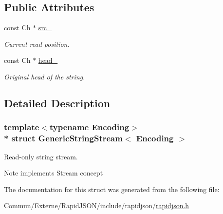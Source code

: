 \subsection*{Public Attributes}
\begin{DoxyCompactItemize}
\item 
const Ch $\ast$ \hyperlink{struct_generic_string_stream_aeda813798e3f2d6bfdac86afc11b6b80}{src\+\_\+}\hypertarget{struct_generic_string_stream_aeda813798e3f2d6bfdac86afc11b6b80}{}\label{struct_generic_string_stream_aeda813798e3f2d6bfdac86afc11b6b80}

\begin{DoxyCompactList}\small\item\em Current read position. \end{DoxyCompactList}\item 
const Ch $\ast$ \hyperlink{struct_generic_string_stream_a3c86ef1e1f0655028cb8a3afce11ee4f}{head\+\_\+}\hypertarget{struct_generic_string_stream_a3c86ef1e1f0655028cb8a3afce11ee4f}{}\label{struct_generic_string_stream_a3c86ef1e1f0655028cb8a3afce11ee4f}

\begin{DoxyCompactList}\small\item\em Original head of the string. \end{DoxyCompactList}\end{DoxyCompactItemize}


\subsection{Detailed Description}
\subsubsection*{template$<$typename Encoding$>$\\*
struct Generic\+String\+Stream$<$ Encoding $>$}

Read-\/only string stream. 

\begin{DoxyNote}{Note}
implements Stream concept 
\end{DoxyNote}


The documentation for this struct was generated from the following file\+:\begin{DoxyCompactItemize}
\item 
Commun/\+Externe/\+Rapid\+J\+S\+O\+N/include/rapidjson/\hyperlink{rapidjson_8h}{rapidjson.\+h}\end{DoxyCompactItemize}
